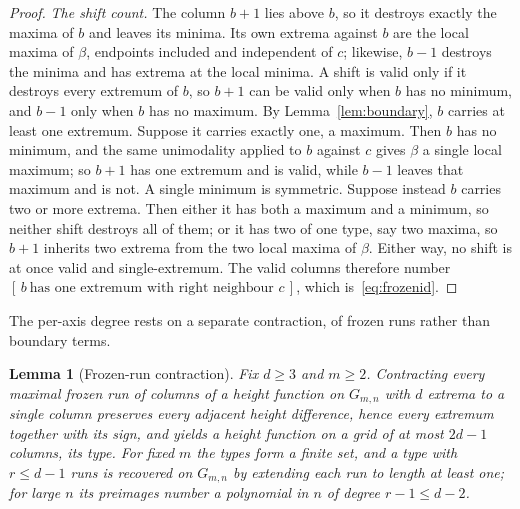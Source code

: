 \documentclass[11pt]{article}
\newtheorem{lemma}[theorem]{Lemma}
\theoremstyle{definition}
\theoremstyle{remark}
\newcommand{\Gmn}{G_{m,n}}
\begin{document}
\begin{proof}
\medskip\noindent\emph{The shift count.} The column $b+1$ lies above $b$, so it
destroys exactly the maxima of $b$ and leaves its minima. Its own extrema against
$b$ are the local maxima of $\beta$, endpoints included and independent of $c$;
likewise, $b-1$ destroys the minima and has extrema at the local minima. A shift is
valid only if it destroys every extremum of $b$, so $b+1$ can be valid only when
$b$ has no minimum, and $b-1$ only when $b$ has no maximum. By
Lemma~\ref{lem:boundary}, $b$ carries at least one extremum. Suppose it carries
exactly one, a maximum. Then $b$ has no minimum, and the same unimodality applied
to $b$ against $c$ gives $\beta$ a single local maximum; so $b+1$ has one extremum
and is valid, while $b-1$ leaves that maximum and is not. A single minimum is
symmetric. Suppose instead $b$ carries two or more extrema. Then either it has both
a maximum and a minimum, so neither shift destroys all of them; or it has two of
one type, say two maxima, so $b+1$ inherits two extrema from the two local maxima
of $\beta$. Either way, no shift is at once valid and single-extremum. The valid
columns therefore number $[\,b\ \text{has one extremum with right neighbour }c\,]$,
which is~\eqref{eq:frozenid}.
\end{proof}

The per-axis degree rests on a separate contraction, of frozen runs rather than
boundary terms.

\begin{lemma}[Frozen-run contraction]\label{lem:contract}
Fix $d\ge3$ and $m\ge2$. Contracting every maximal frozen run of columns of a
height function on $\Gmn$ with $d$ extrema to a single column preserves every
adjacent height difference, hence every extremum together with its sign, and
yields a height function on a grid of at most $2d-1$ columns, its \emph{type}.
For fixed $m$ the types form a finite set, and a type with $r\le d-1$ runs is
recovered on $\Gmn$ by extending each run to length at least one; for large
$n$ its preimages number a polynomial in $n$ of degree $r-1\le d-2$.
\end{lemma}
\end{document}
